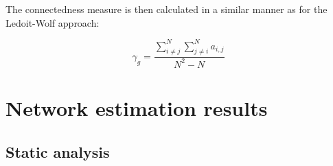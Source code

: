 \documentclass[12pt]{article}
\begin{document}
The connectedness measure is then calculated in a similar manner as for the Ledoit-Wolf approach:

\begin{equation}
\gamma_{g} = \frac{\sum_{i \neq j}^{N} \sum_{j \neq i}^N a_{i,j}}{N^2 - N}	
\end{equation}

\section{Network estimation results}\label{section:network_results}

\subsection{Static analysis}\label{subsection:static}
\end{document}
